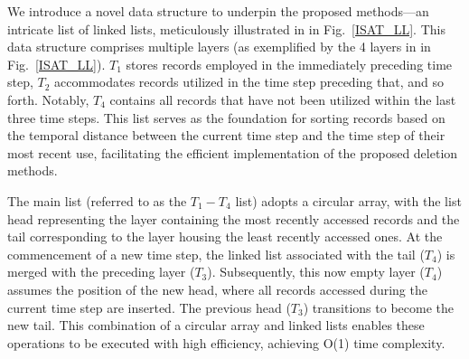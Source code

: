 

We introduce a novel data structure to underpin the proposed methods—an intricate list of linked lists, meticulously illustrated in in Fig.~\ref{ISAT_LL}. This data structure comprises multiple layers (as exemplified by the 4 layers in in Fig.~\ref{ISAT_LL}). $T_1$ stores records employed in the immediately preceding time step, $T_2$ accommodates records utilized in the time step preceding that, and so forth. Notably, $T_4$ contains all records that have not been utilized within the last three time steps. This list serves as the foundation for sorting records based on the temporal distance between the current time step and the time step of their most recent use, facilitating the efficient implementation of the proposed deletion methods.

The main list (referred to as the $T_1-T_4$ list) adopts a circular array, with the list head representing the layer containing the most recently accessed records and the tail corresponding to the layer housing the least recently accessed ones. At the commencement of a new time step, the linked list associated with the tail ($T_4$) is merged with the preceding layer ($T_3$). Subsequently, this now empty layer ($T_4$) assumes the position of the new head, where all records accessed during the current time step are inserted. The previous head ($T_3$) transitions to become the new tail. This combination of a circular array and linked lists enables these operations to be executed with high efficiency, achieving O(1) time complexity.

